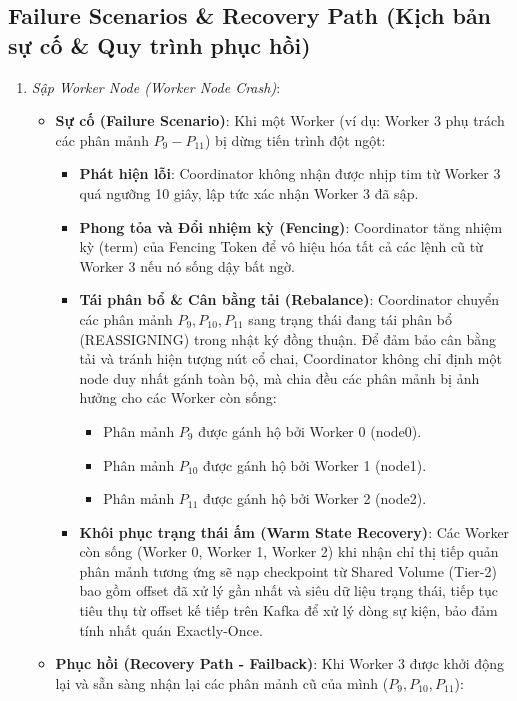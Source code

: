 \documentclass[12pt,a4paper]{article}
\begin{document}
\subsection{Failure Scenarios \& Recovery Path (Kịch bản sự cố \& Quy trình phục hồi)}
\begin{enumerate}
        \item \textit{Sập Worker Node (Worker Node Crash)}:
        \begin{itemize}[label={-}]
            \item \textbf{Sự cố (Failure Scenario)}: Khi một Worker (ví dụ: Worker 3 phụ trách các phân mảnh $P_9 - P_{11}$) bị dừng tiến trình đột ngột:
            \begin{itemize}
                \item \textbf{Phát hiện lỗi}: Coordinator không nhận được nhịp tim từ Worker 3 quá ngưỡng 10 giây, lập tức xác nhận Worker 3 đã sập.
                \item \textbf{Phong tỏa và Đổi nhiệm kỳ (Fencing)}: Coordinator tăng nhiệm kỳ (term) của Fencing Token để vô hiệu hóa tất cả các lệnh cũ từ Worker 3 nếu nó sống dậy bất ngờ.
                \item \textbf{Tái phân bổ \& Cân bằng tải (Rebalance)}: Coordinator chuyển các phân mảnh $P_9, P_{10}, P_{11}$ sang trạng thái đang tái phân bổ (REASSIGNING) trong nhật ký đồng thuận. Để đảm bảo cân bằng tải và tránh hiện tượng nút cổ chai, Coordinator không chỉ định một node duy nhất gánh toàn bộ, mà chia đều các phân mảnh bị ảnh hưởng cho các Worker còn sống:
                \begin{itemize}[label={-}]
                    \item Phân mảnh $P_9$ được gánh hộ bởi Worker 0 (node0).
                    \item Phân mảnh $P_{10}$ được gánh hộ bởi Worker 1 (node1).
                    \item Phân mảnh $P_{11}$ được gánh hộ bởi Worker 2 (node2).
                \end{itemize}
                \item \textbf{Khôi phục trạng thái ấm (Warm State Recovery)}: Các Worker còn sống (Worker 0, Worker 1, Worker 2) khi nhận chỉ thị tiếp quản phân mảnh tương ứng sẽ nạp checkpoint từ Shared Volume (Tier-2) bao gồm offset đã xử lý gần nhất và siêu dữ liệu trạng thái, tiếp tục tiêu thụ từ offset kế tiếp trên Kafka để xử lý dòng sự kiện, bảo đảm tính nhất quán Exactly-Once.
            \end{itemize}
            \item \textbf{Phục hồi (Recovery Path - Failback)}: Khi Worker 3 được khởi động lại và sẵn sàng nhận lại các phân mảnh cũ của mình ($P_9, P_{10}, P_{11}$):

\end{itemize}
\end{enumerate}
\end{document}
